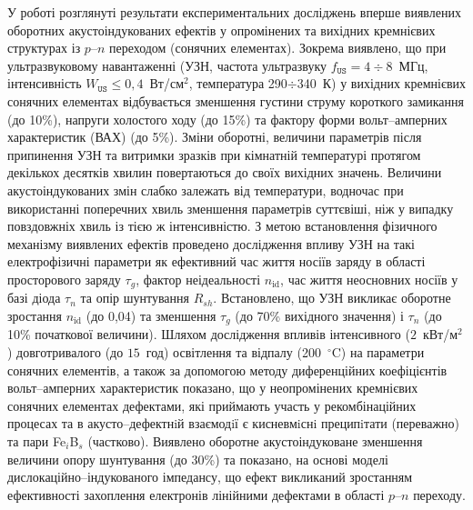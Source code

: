 У  роботі розглянуті результати експериментальних досліджень вперше виявлених оборотних акустоіндукованих ефектів у опромінених та вихідних кремнієвих структурах із  $p$--$n$ переходом (сонячних елементах).
Зокрема виявлено, що при ультразвуковому навантаженні (УЗН, частота ультразвуку $f_\mathtt{US}=4\div8$~МГц, інтенсивність $W_\mathtt{US}\leq0,4$~Вт/см$^2$, температура 290$\div$340~К) у вихідних кремнієвих сонячних елементах  відбувається  зменшення густини струму короткого замикання (до 10\%), напруги холостого ходу  (до 15\%) та фактору форми вольт--амперних характеристик (ВАХ) (до 5\%).
Зміни оборотні, величини параметрів  після припинення УЗН  та витримки зразків при кімнатній температурі протягом декількох десятків хвилин повертаються до своїх вихідних значень.
Величини акустоіндукованих змін слабко залежать від температури, водночас при використанні поперечних хвиль зменшення параметрів суттєвіші, ніж у випадку повздовжніх хвиль із тією ж інтенсивністю.
З метою встановлення фізичного механізму виявлених ефектів проведено дослідження впливу УЗН на такі електрофізичні параметри як
ефективний час життя носіїв заряду в області просторового заряду $\tau_{g}$,
фактор неідеальності $n_\mathrm{id}$,
час життя неосновних носіїв у базі діода $\tau_n$
та опір шунтування $R_{sh}$.
Встановлено, що УЗН викликає оборотне зростання $n_\mathrm{id}$  (до 0,04) та зменшення $\tau_g$ (до 70\% вихідного значення) і
$\tau_n$ (до 10\% початкової величини).
Шляхом дослідження  впливів інтенсивного ($2$~кВт/м$^2$) довготривалого (до  $15$~год) освітлення
та відпалу (200~$^\circ$C) на параметри сонячних елементів,
а також за допомогою
методу диференційних коефіцієнтів вольт--амперних характеристик показано, що
у неопромінених кремнієвих сонячних елементах
дефектами, які приймають участь у рекомбінаційних процесах та  в акусто--дефектнiй взаємодiї є кисневмiснi преципiтати (переважно) та
пари Fe$_i$B$_s$ (частково).
Виявлено оборотне акустоіндуковане зменшення величини  опору шунтування (до 30\%) та показано,
на основі моделі дислокаційно--індукованого імпедансу, що ефект викликаний зростанням ефективності захоплення електронів лінійними дефектами в області $p$--$n$ переходу.


